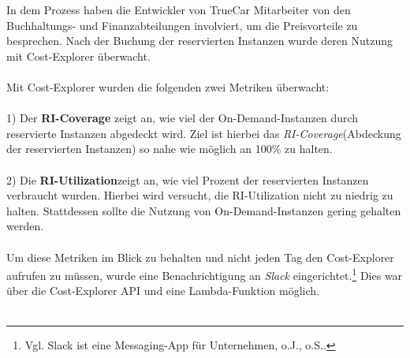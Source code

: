 In dem Prozess haben die Entwickler von TrueCar Mitarbeiter von den Buchhaltungs- und Finanzabteilungen involviert, um die Preisvorteile zu besprechen. Nach der Buchung der reservierten Instanzen wurde deren Nutzung mit Cost-Explorer überwacht. 
\\\\
Mit Cost-Explorer wurden die folgenden zwei Metriken überwacht: 
\\\\
1) Der \textbf{RI-Coverage} zeigt an, wie viel der On-Demand-Instanzen durch reservierte Instanzen abgedeckt wird. Ziel ist hierbei das \textit{RI-Coverage}(Abdeckung der reservierten Instanzen) so nahe wie möglich an 100\% zu halten.
\\\\
2) Die \textbf{RI-Utilization}zeigt an, wie viel Prozent der reservierten Instanzen verbraucht wurden. Hierbei wird versucht, die RI-Utilization nicht zu niedrig zu halten. Stattdessen sollte die Nutzung von On-Demand-Instanzen gering gehalten werden. 
\\\\
Um diese Metriken im Blick zu behalten und nicht jeden Tag den Cost-Explorer aufrufen zu müssen, wurde eine Benachrichtigung an \textit{Slack} eingerichtet.\footnote{Vgl. Slack ist eine Messaging-App für Unternehmen, o.J., o.S.\cite{SLACK}.} Dies war über die Cost-Explorer API und eine Lambda-Funktion möglich.
\\\\

